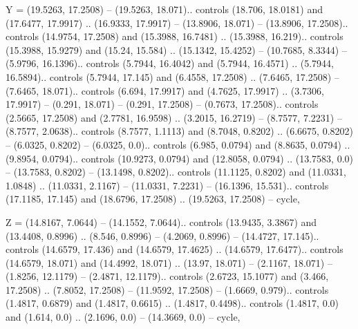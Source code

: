 Y = {(19.5263, 17.2508) -- (19.5263, 18.071).. controls (18.706, 18.0181) and (17.6477, 17.9917) .. (16.9333, 17.9917) -- (13.8906, 18.071) -- (13.8906, 17.2508).. controls (14.9754, 17.2508) and (15.3988, 16.7481) .. (15.3988, 16.219).. controls (15.3988, 15.9279) and (15.24, 15.584) .. (15.1342, 15.4252) -- (10.7685, 8.3344) -- (5.9796, 16.1396).. controls (5.7944, 16.4042) and (5.7944, 16.4571) .. (5.7944, 16.5894).. controls (5.7944, 17.145) and (6.4558, 17.2508) .. (7.6465, 17.2508) -- (7.6465, 18.071).. controls (6.694, 17.9917) and (4.7625, 17.9917) .. (3.7306, 17.9917) -- (0.291, 18.071) -- (0.291, 17.2508) -- (0.7673, 17.2508).. controls (2.5665, 17.2508) and (2.7781, 16.9598) .. (3.2015, 16.2719) -- (8.7577, 7.2231) -- (8.7577, 2.0638).. controls (8.7577, 1.1113) and (8.7048, 0.8202) .. (6.6675, 0.8202) -- (6.0325, 0.8202) -- (6.0325, 0.0).. controls (6.985, 0.0794) and (8.8635, 0.0794) .. (9.8954, 0.0794).. controls (10.9273, 0.0794) and (12.8058, 0.0794) .. (13.7583, 0.0) -- (13.7583, 0.8202) -- (13.1498, 0.8202).. controls (11.1125, 0.8202) and (11.0331, 1.0848) .. (11.0331, 2.1167) -- (11.0331, 7.2231) -- (16.1396, 15.531).. controls (17.1185, 17.145) and (18.6796, 17.2508) .. (19.5263, 17.2508) -- cycle},

Z = {(14.8167, 7.0644) -- (14.1552, 7.0644).. controls (13.9435, 3.3867) and (13.4408, 0.8996) .. (8.546, 0.8996) -- (4.2069, 0.8996) -- (14.4727, 17.145).. controls (14.6579, 17.436) and (14.6579, 17.4625) .. (14.6579, 17.6477).. controls (14.6579, 18.071) and (14.4992, 18.071) .. (13.97, 18.071) -- (2.1167, 18.071) -- (1.8256, 12.1179) -- (2.4871, 12.1179).. controls (2.6723, 15.1077) and (3.466, 17.2508) .. (7.8052, 17.2508) -- (11.9592, 17.2508) -- (1.6669, 0.979).. controls (1.4817, 0.6879) and (1.4817, 0.6615) .. (1.4817, 0.4498).. controls (1.4817, 0.0) and (1.614, 0.0) .. (2.1696, 0.0) -- (14.3669, 0.0) -- cycle},